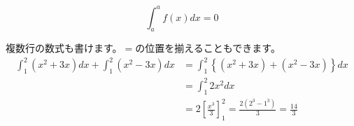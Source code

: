 \documentclass[a4paper,12pt]{ltjsarticle}
\begin{document}
\begin{equation}
  \int_{a}^{a}f\left(x\right)dx = 0
\end{equation}

複数行の数式も書けます。$=$の位置を揃えることもできます。\\

\begin{align}
  \int_{1}^{2}\left(x^2 + 3x\right)dx + \int_{1}^{2}\left(x^2 - 3x\right)dx &= \int_{1}^{2}\left\{\left(x^2 + 3x\right) + \left(x^2 - 3x\right)\right\}dx \\
  &= \int_{1}^{2}2x^2dx \\
  &= 2\left[\frac{x^3}{3}\right]^2_1 = \frac{2\left(2^3 - 1^3\right)}{3} = \frac{14}{3}
\end{align}
\end{document}
